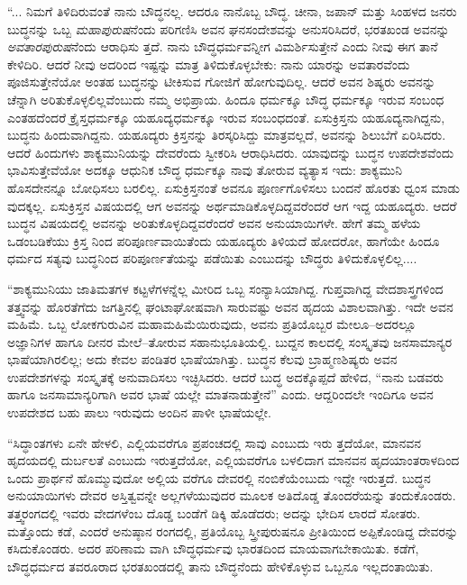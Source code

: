 “... ನಿಮಗೆ ತಿಳಿದಿರುವಂತೆ ನಾನು ಬೌದ್ಧನಲ್ಲ. ಆದರೂ ನಾನೊಬ್ಬ ಬೌದ್ಧ. ಚೀನಾ, ಜಪಾನ್ ಮತ್ತು ಸಿಂಹಳದ ಜನರು ಬುದ್ಧನನ್ನು ಒಬ್ಬ \textit{ಮಹಾಪುರುಷ}ನೆಂದು ಪರಿಗಣಿಸಿ ಅವನ ಘನಸಂದೇಶವನ್ನು ಅನುಸರಿಸಿದರೆ, ಭರತಖಂಡ ಅವನನ್ನು \textit{ಅವತಾರಪುರುಷ}ನೆಂದು ಆರಾಧಿಸು ತ್ತದೆ. ನಾನು ಬೌದ್ಧಧರ್ಮವನ್ನೀಗ ವಿಮರ್ಶಿಸುತ್ತೇನೆ ಎಂದು ನೀವು ಈಗ ತಾನೆ ಕೇಳಿದಿರಿ. ಆದರೆ ನೀವು ಅದರಿಂದ ಇಷ್ಟನ್ನು ಮಾತ್ರ ತಿಳಿದುಕೊಳ್ಳಬೇಕು: ನಾನು ಯಾರನ್ನು ಅವತಾರವೆಂದು ಪೂಜಿಸುತ್ತೇನೆಯೋ ಅಂತಹ ಬುದ್ಧನನ್ನು ಟೀಕಿಸುವ ಗೋಜಿಗೆ ಹೋಗುವುದಿಲ್ಲ. ಆದರೆ ಅವನ ಶಿಷ್ಯರು ಅವನನ್ನು ಚೆನ್ನಾಗಿ ಅರಿತುಕೊಳ್ಳಲಿಲ್ಲವೆಂಬುದು ನಮ್ಮ ಅಭಿಪ್ರಾಯ. ಹಿಂದೂ ಧರ್ಮಕ್ಕೂ ಬೌದ್ಧ ಧರ್ಮಕ್ಕೂ ಇರುವ ಸಂಬಂಧ ಎಂತಹದೆಂದರೆ ಕ್ರೈಸ್ತಧರ್ಮಕ್ಕೂ ಯಹೂದ್ಯಧರ್ಮಕ್ಕೂ ಇರುವ ಸಂಬಂಧದಂತೆ. ಏಸುಕ್ರಿಸ್ತನು ಯಹೂದ್ಯನಾಗಿದ್ದನು, ಬುದ್ಧನು ಹಿಂದುವಾಗಿದ್ದನು. ಯಹೂದ್ಯರು ಕ್ರಿಸ್ತನನ್ನು ತಿರಸ್ಕರಿಸಿದ್ದು ಮಾತ್ರವಲ್ಲದೆ, ಅವನನ್ನು ಶಿಲುಬೆಗೆ ಏರಿಸಿದರು. ಆದರೆ ಹಿಂದುಗಳು ಶಾಕ್ಯಮುನಿಯನ್ನು ದೇವರೆಂದು ಸ್ವೀಕರಿಸಿ ಆರಾಧಿಸಿದರು. ಯಾವುದನ್ನು ಬುದ್ಧನ ಉಪದೇಶವೆಂದು ಭಾವಿಸುತ್ತೇವೆಯೋ ಅದಕ್ಕೂ ಆಧುನಿಕ ಬೌದ್ಧ ಧರ್ಮಕ್ಕೂ ನಾವು ತೋರುವ ವ್ಯತ್ಯಾಸ ಇದು: ಶಾಕ್ಯಮುನಿ ಹೊಸದೇನನ್ನೂ ಬೋಧಿಸಲು ಬರಲಿಲ್ಲ. ಏಸುಕ್ರಿಸ್ತನಂತೆ ಅವನೂ ಪೂರ್ಣಗೊಳಿಸಲು ಬಂದನೆ ಹೊರತು ಧ್ವಂಸ ಮಾಡು ವುದಕ್ಕಲ್ಲ. ಏಸುಕ್ರಿಸ್ತನ ವಿಷಯದಲ್ಲಿ ಆಗ ಅವನನ್ನು ಅರ್ಥಮಾಡಿಕೊಳ್ಳದಿದ್ದವರೆಂದರೆ ಆಗ ಇದ್ದ ಯಹೂದ್ಯರು. ಆದರೆ ಬುದ್ಧನ ವಿಷಯದಲ್ಲಿ ಅವನನ್ನು ಅರಿತುಕೊಳ್ಳದಿದ್ದವರೆಂದರೆ ಅವನ ಅನುಯಾಯಿಗಳೇ. ಹೇಗೆ ತಮ್ಮ ಹಳೆಯ ಒಡಂಬಡಿಕೆಯು  ಕ್ರಿಸ್ತ ನಿಂದ ಪರಿಪೂರ್ಣವಾಯಿತೆಂದು ಯಹೂದ್ಯರು ತಿಳಿಯದೆ ಹೋದರೋ, ಹಾಗೆಯೇ ಹಿಂದೂ ಧರ್ಮದ ಸತ್ಯವು ಬುದ್ಧನಿಂದ ಪರಿಪೂರ್ಣತೆಯನ್ನು ಪಡೆಯಿತು ಎಂಬುದನ್ನು ಬೌದ್ಧರು ತಿಳಿದುಕೊಳ್ಳಲಿಲ್ಲ....

“ಶಾಕ್ಯಮುನಿಯು ಜಾತಿಮತಗಳ ಕಟ್ಟಳೆಗಳನ್ನೆಲ್ಲ ಮೀರಿದ ಒಬ್ಬ ಸಂನ್ಯಾಸಿಯಾಗಿದ್ದ. ಗುಪ್ತವಾಗಿದ್ದ ವೇದಶಾಸ್ತ್ರಗಳಿಂದ ತತ್ತ್ವವನ್ನು ಹೊರತೆಗೆದು ಜಗತ್ತಿನಲ್ಲಿ ಘಂಟಾಘೋಷವಾಗಿ ಸಾರುವಷ್ಟು ಅವನ ಹೃದಯ ವಿಶಾಲವಾಗಿತ್ತು. ಇದೇ ಅವನ ಮಹಿಮೆ. ಒಬ್ಬ ಲೋಕಗುರುವಿನ ಮಹಾಮಹಿಮೆಯಿರುವುದು, ಅವನು ಪ್ರತಿಯೊಬ್ಬರ ಮೇಲೂ–ಅದರಲ್ಲೂ ಅಜ್ಞಾನಿಗಳ ಹಾಗೂ ದೀನರ ಮೇಲೆ–ತೋರುವ ಸಹಾನುಭೂತಿಯಲ್ಲಿ. ಬುದ್ದನ ಕಾಲದಲ್ಲಿ ಸಂಸ್ಕೃತವು ಜನಸಾಮಾನ್ಯರ ಭಾಷೆಯಾಗಿರಲಿಲ್ಲ; ಅದು ಕೇವಲ ಪಂಡಿತರ ಭಾಷೆಯಾಗಿತ್ತು. ಬುದ್ಧನ ಕೆಲವು ಬ್ರಾಹ್ಮಣಶಿಷ್ಯರು ಅವನ ಉಪದೇಶಗಳನ್ನು ಸಂಸ್ಕೃತಕ್ಕೆ ಅನುವಾದಿಸಲು ಇಚ್ಛಿಸಿದರು. ಆದರೆ ಬುದ್ಧ ಅದಕ್ಕೊಪ್ಪದೆ ಹೇಳಿದ, “ನಾನು ಬಡವರು ಹಾಗೂ ಜನಸಾಮಾನ್ಯರಿಗಾಗಿ ಅವರ ಭಾಷೆ ಯಲ್ಲೇ ಮಾತನಾಡುತ್ತೇನೆ” ಎಂದು. ಆದ್ದರಿಂದಲೇ ಇಂದಿಗೂ ಅವನ ಉಪದೇಶದ ಬಹು ಪಾಲು ಇರುವುದು ಅಂದಿನ ಪಾಳೀ ಭಾಷೆಯಲ್ಲೇ.

“ಸಿದ್ಧಾಂತಗಳು ಏನೇ ಹೇಳಲಿ, ಎಲ್ಲಿಯವರೆಗೂ ಪ್ರಪಂಚದಲ್ಲಿ ಸಾವು ಎಂಬುದು ಇರು ತ್ತದೆಯೋ, ಮಾನವನ ಹೃದಯದಲ್ಲಿ ದುರ್ಬಲತೆ ಎಂಬುದು ಇರುತ್ತದೆಯೋ, ಎಲ್ಲಿಯವರೆಗೂ ಬಳಲಿದಾಗ ಮಾನವನ ಹೃದಯಾಂತರಾಳದಿಂದ ಒಂದು ಪ್ರಾರ್ಥನೆ ಹೊಮ್ಮುವುದೋ ಅಲ್ಲಿಯ ವರೆಗೂ ದೇವರಲ್ಲಿ ನಂಬಿಕೆಯೆಂಬುದು ಇದ್ದೇ ಇರುತ್ತದೆ. ಬುದ್ಧನ ಅನುಯಾಯಿಗಳು ದೇವರ ಅಸ್ತಿತ್ವವನ್ನೇ ಅಲ್ಲಗಳೆಯುವುದರ ಮೂಲಕ ಅತಿದೊಡ್ಡ ತೊಂದರೆಯನ್ನು ತಂದುಕೊಂಡರು. ತತ್ತ್ವರಂಗದಲ್ಲಿ ಇವರು ವೇದಗಳೆಂಬ ದೊಡ್ಡ ಬಂಡೆಗೆ ಡಿಕ್ಕಿ ಹೊಡೆದರು; ಅದನ್ನು ಭೇದಿಸ ಲಾರದೆ ಸೋತರು. ಮತ್ತೊಂದು ಕಡೆ, ಎಂದರೆ ಅನುಷ್ಠಾನ ರಂಗದಲ್ಲಿ, ಪ್ರತಿಯೊಬ್ಬ ಸ್ತ್ರೀಪುರುಷನೂ ಪ್ರೀತಿಯಿಂದ ಅಪ್ಪಿಕೊಂಡಿದ್ದ ದೇವರನ್ನು ಕಸಿದುಕೊಂಡರು. ಅದರ ಪರಿಣಾಮ ವಾಗಿ ಬೌದ್ಧಧರ್ಮವು ಭಾರತದಿಂದ ಮಾಯವಾಗಬೇಕಾಯಿತು. ಕಡೆಗೆ, ಬೌದ್ಧಧರ್ಮದ ತವರೂರಾದ ಭರತಖಂಡದಲ್ಲಿ ತಾನು ಬೌದ್ಧನೆಂದು ಹೇಳಿಕೊಳ್ಳುವ ಒಬ್ಬನೂ ಇಲ್ಲದಂತಾಯಿತು.

